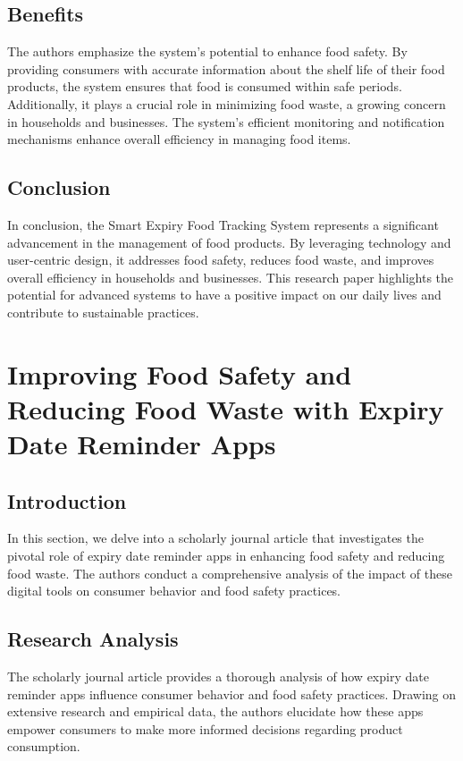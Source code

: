 \subsection{Benefits}
The authors emphasize the system's potential to enhance food safety. By providing consumers with accurate information about the shelf life of their food products, the system ensures that food is consumed within safe periods. Additionally, it plays a crucial role in minimizing food waste, a growing concern in households and businesses. The system's efficient monitoring and notification mechanisms enhance overall efficiency in managing food items.

\subsection{Conclusion}
In conclusion, the Smart Expiry Food Tracking System represents a significant advancement in the management of food products. By leveraging technology and user-centric design, it addresses food safety, reduces food waste, and improves overall efficiency in households and businesses. This research paper highlights the potential for advanced systems to have a positive impact on our daily lives and contribute to sustainable practices.



\section{Improving Food Safety and Reducing Food Waste with Expiry Date Reminder Apps}

\subsection{Introduction}
In this section, we delve into a scholarly journal article that investigates the pivotal role of expiry date reminder apps in enhancing food safety and reducing food waste. The authors conduct a comprehensive analysis of the impact of these digital tools on consumer behavior and food safety practices.

\subsection{Research Analysis}
The scholarly journal article provides a thorough analysis of how expiry date reminder apps influence consumer behavior and food safety practices. Drawing on extensive research and empirical data, the authors elucidate how these apps empower consumers to make more informed decisions regarding product consumption.

